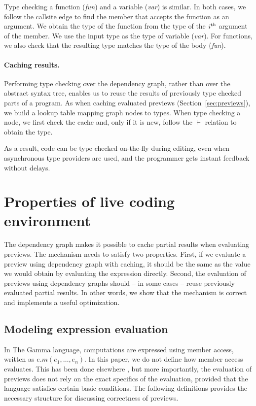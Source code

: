 \documentclass[sigplan,10pt]{acmart}\settopmatter{printfolios=true,printccs=false,printacmref=false}
\theoremstyle{plain}
\theoremstyle{definition}
\newcommand{\blbl}[1]{\textnormal{\textcolor{numclr}{\sffamily #1}}}
\begin{document}
Type checking a function (\emph{fun}) and a variable (\emph{var}) is similar. In both cases,
we follow the \blbl{callsite} edge to find the member that accepts the function as an argument.
We obtain the type of the function from the type of the $i^\textnormal{th}$ argument of the 
member. We use the input type as the type of variable (\emph{var}). For functions, we also check 
that the resulting type matches the type of the body (\emph{fun}).

\paragraph{Caching results.}
Performing type checking over the dependency graph, rather than over the abstract syntax tree,
enables us to reuse the results of previously type checked parts of a program. As when 
caching evaluated previews (Section~\ref{sec:previews}), we build a lookup table mapping graph
nodes to types. When type checking a node, we first check the cache and, only if it is new, 
follow the $\vdash$ relation to obtain the type. 

As a result, code can be type checked on-the-fly during editing, even when asynchronous type 
providers are used, and the programmer gets instant feedback without delays.


\section{Properties of live coding environment}
\label{sec:properties}

The dependency graph makes it possible to cache partial results when evaluating previews. 
The mechanism needs to satisfy two properties.
First, if we evaluate a preview using dependency graph with caching, it should be the same as the
value we would obtain by evaluating the expression directly. Second, the evaluation of previews 
using dependency graphs should -- in some cases -- reuse previously evaluated partial results.
In other words, we show that the mechanism is correct and implements a useful optimization. 

\subsection{Modeling expression evaluation}
In The Gamma language, computations are expressed using
member access, written as $e.m(e_1,\ldots, e_n)$. In this paper, we do not define how member
access evaluates. This has been done elsewhere \cite{gamma}, but more importantly, the evaluation of
previews does not rely on the exact specifics of the evaluation, provided that the language
satisfies certain basic conditions. The following definitions provides the necessary structure 
for discussing correctness of previews.
\end{document}
